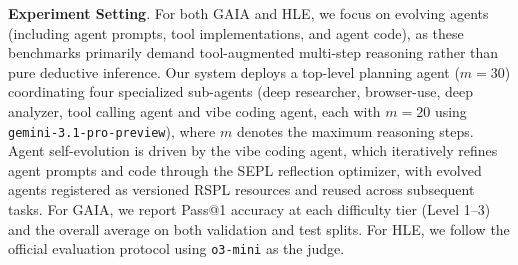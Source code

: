 \documentclass{article}
\theoremstyle{plain}
\theoremstyle{definition}
\theoremstyle{remark}
\newcommand{\projectname}{\textbf{\textsc{AGP}}\xspace}
\newcommand{\projectnameAgent}{\textbf{\textsc{AGS}}\xspace}
\begin{document}
\textbf{Experiment Setting}. For both GAIA and HLE, we focus on evolving agents (including agent prompts, tool implementations, and agent code), as these benchmarks primarily demand tool-augmented multi-step reasoning rather than pure deductive inference. Our system deploys a top-level planning agent ($m=30$) coordinating four specialized sub-agents (deep researcher, browser-use, deep analyzer, tool calling agent and vibe coding agent, each with $m=20$ using \texttt{gemini-3.1-pro-preview}), where $m$ denotes the maximum reasoning steps. Agent self-evolution is driven by the vibe coding agent, which iteratively refines agent prompts and code through the SEPL reflection optimizer, with evolved agents registered as versioned RSPL resources and reused across subsequent tasks. For GAIA, we report Pass@1 accuracy at each difficulty tier (Level 1--3) and the overall average on both validation and test splits. For HLE, we follow the official evaluation protocol using \texttt{o3-mini} as the judge.

\end{document}
